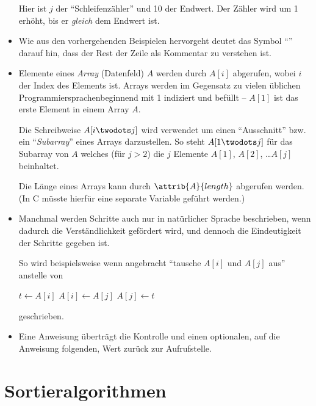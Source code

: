 \begin{itemize}
\begin{minipage}[t]{0.48\linewidth}
        Hier ist $j$ der \enquote{Schleifenzähler} und 10 der Endwert. Der Zähler wird um 1 erhöht, bis er \emph{gleich} dem Endwert ist.
    \end{minipage}
    
    \item Wie aus den vorhergehenden Beispielen hervorgeht deutet das Symbol \enquote{\Comment} darauf hin, dass der Rest der Zeile als Kommentar zu verstehen ist.
    
    \item Elemente eines \emph{Array} (Datenfeld) $A$ werden durch $A[i]$ abgerufen, wobei $i$ der Index des Elements ist. Arrays werden im Gegensatz zu vielen üblichen Pro\-grammier\-sprachen\nocit beginnend mit 1 indiziert und befüllt -- $A[1]$ ist das erste Element in einem Array $A$.
    
    Die Schreibweise $A[i \twodots j]$ wird verwendet um einen \enquote{Ausschnitt} bzw. ein \enquote{\emph{Subarray}} eines Arrays darzustellen. So steht $A[1 \twodots j]$ für das Subarray von $A$ welches (für $j > 2$) die $j$ Elemente $A[1]$, $A[2]$, \ldots $A[j]$ beinhaltet.
    
    Die Länge eines Arrays kann durch $\attrib{A}{length}$ abgerufen werden. (In C müsste hierfür eine separate Variable geführt werden.)

    \item Manchmal werden Schritte auch nur in natürlicher Sprache beschrieben, wenn dadurch die Verständlichkeit gefördert wird, und dennoch die Eindeutigkeit der Schritte gegeben ist.

    So wird beispielsweise wenn angebracht \enquote{tausche $A[i]$ und $A[j]$ aus} anstelle von
    \begin{codebox}
        \li $t \gets A[i]$
        \li $A[i] \gets A[j]$
        \li $A[j] \gets t$
    \end{codebox}
    geschrieben.
    
    \item Eine \Return Anweisung überträgt die Kontrolle und einen optionalen, auf die Anweisung folgenden, Wert zurück zur Aufrufstelle.

\end{itemize}

\section{Sortieralgorithmen}
\label{sec:sorting-algorithms-definition}

